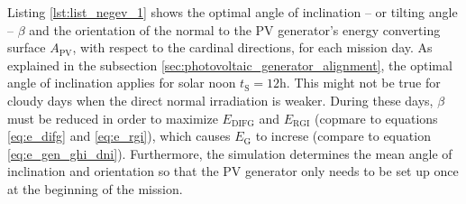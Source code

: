 Listing \ref{lst:list_negev_1} shows the optimal angle of inclination -- or tilting angle -- $\beta$ and the orientation of the normal to the PV generator's energy converting surface $A_\mathrm{PV}$, with respect to the cardinal directions, for each mission day. As explained in the subsection \ref{sec:photovoltaic_generator_alignment}, the optimal angle of inclination applies for solar noon $t_\mathrm{S} = 12\mathrm{h}$. This might not be true for cloudy days when the direct normal irradiation is weaker. During these days, $\beta$ must be reduced in order to maximize $E_\mathrm{DIFG}$ and $E_\mathrm{RGI}$ (copmare to equations \ref{eq:e_difg} and \ref{eq:e_rgi}), which causes $E_\mathrm{G}$ to increse (compare to equation \ref{eq:e_gen_ghi_dni}). Furthermore, the simulation determines the mean angle of inclination and orientation so that the PV generator only needs to be set up once at the beginning of the mission.

